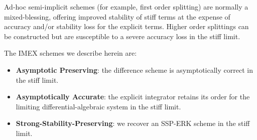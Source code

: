 Ad-hoc semi-implicit schemes (for example, first 
order splitting) are normally a mixed-blessing,
offering improved stability of stiff terms at the expense 
of accuracy and/or stability loss for the explicit terms.
Higher order splittings can be constructed but 
are susceptible to a severe accuracy loss in the stiff limit.

The IMEX schemes we describe herein \cite{pareschi:2000} are:
\begin{itemize}
\item {\bf Asymptotic Preserving}:  the difference scheme 
is asymptotically correct in the stiff limit. 
\item {\bf Asymptotically Accurate}: the explicit 
integrator retains its order for the limiting 
differential-algebraic system in the stiff limit.
\item {\bf Strong-Stability-Preserving}: we recover an 
SSP-ERK \cite{gottlieb:2001} scheme in the stiff limit.
\end{itemize}

